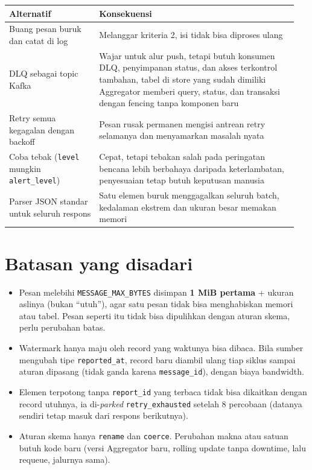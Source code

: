 {\small
\begin{longtable}{@{}>{\raggedright\arraybackslash}p{0.297\linewidth}>{\raggedright\arraybackslash}p{0.649\linewidth}@{}}
\toprule
\textbf{Alternatif} & \textbf{Konsekuensi} \\
\midrule
\endhead
Buang pesan buruk dan catat di log & Melanggar kriteria 2, isi tidak bisa diproses ulang \\
DLQ sebagai topic Kafka & Wajar untuk alur push, tetapi butuh konsumen DLQ, penyimpanan status, dan akses terkontrol tambahan, tabel di store yang sudah dimiliki Aggregator memberi query, status, dan transaksi dengan fencing tanpa komponen baru \\
Retry semua kegagalan dengan backoff & Pesan rusak permanen mengisi antrean retry selamanya dan menyamarkan masalah nyata \\
Coba tebak (\texttt{level} mungkin \texttt{alert\_\allowbreak{}level}) & Cepat, tetapi tebakan salah pada peringatan bencana lebih berbahaya daripada keterlambatan, penyesuaian tetap butuh keputusan manusia \\
Parser JSON standar untuk seluruh respons & Satu elemen buruk menggagalkan seluruh batch, kedalaman ekstrem dan ukuran besar memakan memori \\
\bottomrule
\end{longtable}
}

\section{Batasan yang disadari}

\begin{itemize}
\item Pesan melebihi \texttt{MESSAGE\_\allowbreak{}MAX\_\allowbreak{}BYTES} disimpan \textbf{1 MiB pertama} + ukuran aslinya (bukan ``utuh''), agar satu pesan tidak bisa menghabiskan memori atau tabel. Pesan seperti itu tidak bisa dipulihkan dengan aturan skema, perlu perubahan batas.
\item Watermark hanya maju oleh record yang waktunya bisa dibaca. Bila sumber mengubah tipe \texttt{reported\_\allowbreak{}at}, record baru diambil ulang tiap siklus sampai aturan dipasang (tidak ganda karena \texttt{message\_\allowbreak{}id}), dengan biaya bandwidth.
\item Elemen terpotong tanpa \texttt{report\_\allowbreak{}id} yang terbaca tidak bisa dikaitkan dengan record utuhnya, ia di-\emph{parked} \texttt{retry\_\allowbreak{}exhausted} setelah 8 percobaan (datanya sendiri tetap masuk dari respons berikutnya).
\item Aturan skema hanya \texttt{rename} dan \texttt{coerce}. Perubahan makna atau satuan butuh kode baru (versi Aggregator baru, rolling update tanpa downtime, lalu requeue, jalurnya sama).
\end{itemize}

